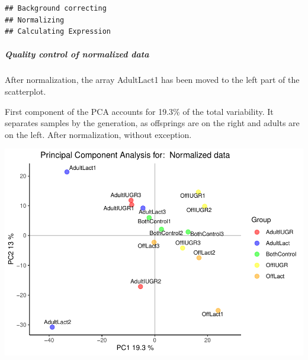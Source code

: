 \documentclass[]{article}
\newenvironment{Shaded}{\begin{snugshade}}{\end{snugshade}}
\newcommand{\KeywordTok}[1]{\textcolor[rgb]{0.13,0.29,0.53}{\textbf{#1}}}
\newcommand{\DataTypeTok}[1]{\textcolor[rgb]{0.13,0.29,0.53}{#1}}
\newcommand{\DecValTok}[1]{\textcolor[rgb]{0.00,0.00,0.81}{#1}}
\newcommand{\StringTok}[1]{\textcolor[rgb]{0.31,0.60,0.02}{#1}}
\newcommand{\OtherTok}[1]{\textcolor[rgb]{0.56,0.35,0.01}{#1}}
\newcommand{\OperatorTok}[1]{\textcolor[rgb]{0.81,0.36,0.00}{\textbf{#1}}}
\newcommand{\NormalTok}[1]{#1}
\let\oldsubparagraph\subparagraph
\renewcommand{\subparagraph}[1]{\oldsubparagraph{#1}\mbox{}}
\begin{document}
\begin{verbatim}
## Background correcting
## Normalizing
## Calculating Expression
\end{verbatim}

\subparagraph{Quality control of normalized
data}\label{quality-control-of-normalized-data}

After normalization, the array AdultLact1 has been moved to the left
part of the scatterplot.

First component of the PCA accounts for 19.3\% of the total variability.
It separates samples by the generation, as offsprings are on the right
and adults are on the left. After normalization, without exception.

\begin{Shaded}
\end{Shaded}

\includegraphics{delVal_AnaIsabel_ADO_PEC1_files/figure-latex/unnamed-chunk-17-1.pdf}
\end{document}
